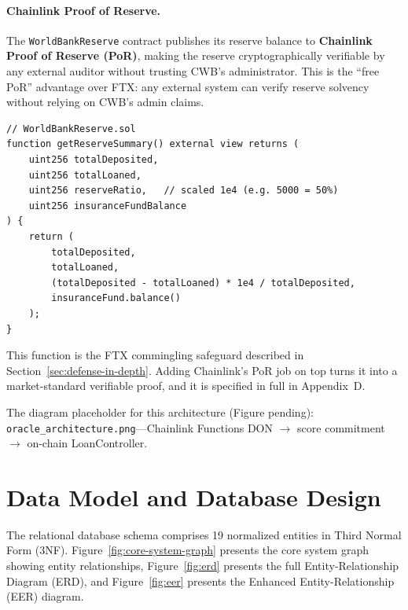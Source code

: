 \documentclass[12pt,a4paper]{report}
\begin{document}
\paragraph{Chainlink Proof of Reserve.}
The \texttt{WorldBankReserve} contract publishes its reserve balance to \textbf{Chainlink Proof of Reserve (PoR)}, making the reserve cryptographically verifiable by any external auditor without trusting CWB's administrator. This is the ``free PoR'' advantage over FTX: any external system can verify reserve solvency without relying on CWB's admin claims.

\begin{verbatim}
// WorldBankReserve.sol
function getReserveSummary() external view returns (
    uint256 totalDeposited,
    uint256 totalLoaned,
    uint256 reserveRatio,   // scaled 1e4 (e.g. 5000 = 50%)
    uint256 insuranceFundBalance
) {
    return (
        totalDeposited,
        totalLoaned,
        (totalDeposited - totalLoaned) * 1e4 / totalDeposited,
        insuranceFund.balance()
    );
}
\end{verbatim}

This function is the FTX commingling safeguard described in Section~\ref{sec:defense-in-depth}. Adding Chainlink's PoR job on top turns it into a market-standard verifiable proof, and it is specified in full in Appendix~D.

The diagram placeholder for this architecture (Figure pending): \texttt{oracle\_architecture.png}---Chainlink Functions DON $\to$ score commitment $\to$ on-chain LoanController.


\section{Data Model and Database Design}

The relational database schema comprises 19 normalized entities in Third Normal Form (3NF). Figure~\ref{fig:core-system-graph} presents the core system graph showing entity relationships, Figure~\ref{fig:erd} presents the full Entity-Relationship Diagram (ERD), and Figure~\ref{fig:eer} presents the Enhanced Entity-Relationship (EER) diagram.
\end{document}

